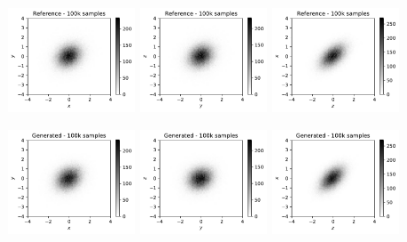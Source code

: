\documentclass[twocolumn,preprintnumbers,superscriptaddress]{revtex4-2}
\begin{document}
\begin{figure}
  \includegraphics[width=0.3\textwidth]{plots/3Dgaussian_posdef/1-2_REAL_100k.pdf}%
  \includegraphics[width=0.3\textwidth]{plots/3Dgaussian_posdef/2-3_REAL_100k.pdf}%
  \includegraphics[width=0.3\textwidth]{plots/3Dgaussian_posdef/3-1_REAL_100k.pdf}

  \includegraphics[width=0.3\textwidth]{plots/3Dgaussian_posdef/1-2_FAKE_100k.pdf}%
  \includegraphics[width=0.3\textwidth]{plots/3Dgaussian_posdef/2-3_FAKE_100k.pdf}%
  \includegraphics[width=0.3\textwidth]{plots/3Dgaussian_posdef/3-1_FAKE_100k.pdf}


\end{figure}
\end{document}
